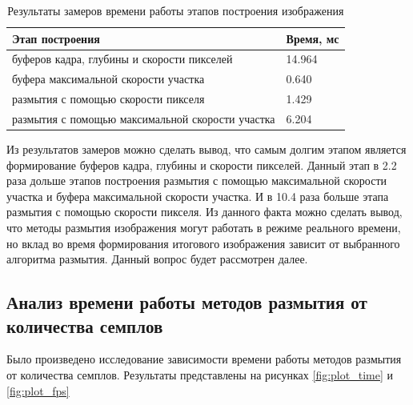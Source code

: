 \begin{longtable}{|l|l|}

    \caption{Результаты замеров времени работы этапов построения изображения}
    \label{tbl:time}
    \\
    \hline
        Этап построения                                     & Время, мс \\ \hline    \hline
        буферов кадра, глубины и скорости пикселей          & 14.964   \\ \hline
        буфера максимальной скорости участка                & 0.640    \\ \hline
        размытия с помощью скорости пикселя                 & 1.429    \\ \hline
        размытия с помощью максимальной скорости участка    & 6.204    \\ \hline
\end{longtable}

Из результатов замеров можно сделать вывод, что самым долгим этапом является формирование буферов кадра, глубины и скорости пикселей. Данный этап в 2.2 раза дольше этапов построения размытия с помощью максимальной скорости участка и буфера максимальной скорости участка. И в 10.4 раза больше этапа размытия с помощью скорости пикселя. Из данного факта можно сделать вывод, что методы размытия изображения могут работать в режиме реального времени, но вклад во время формирования итогового изображения зависит от выбранного алгоритма размытия. Данный вопрос будет рассмотрен далее.


\subsection{Анализ времени работы методов размытия от количества семплов}

Было произведено исследование зависимости времени работы методов размытия от количества семплов. Результаты представлены на рисунках \ref{fig:plot_time} и \ref{fig:plot_fps}

